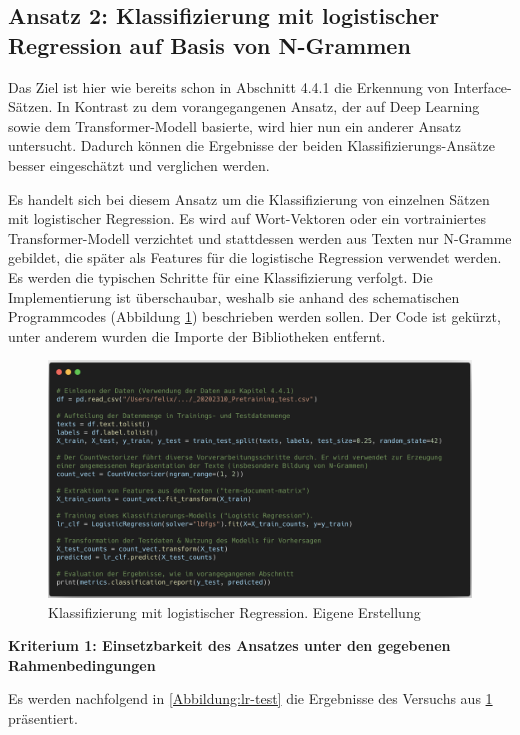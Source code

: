 \subsection{Ansatz 2: Klassifizierung mit logistischer Regression auf Basis von N-Grammen}

Das Ziel ist hier wie bereits schon in Abschnitt 4.4.1 die Erkennung von Interface-Sätzen. In Kontrast zu dem vorangegangenen Ansatz, der auf Deep Learning sowie dem Transformer-Modell basierte, wird hier nun ein anderer Ansatz untersucht. Dadurch können die Ergebnisse der beiden Klassifizierungs-Ansätze besser eingeschätzt und verglichen werden. 

Es handelt sich bei diesem Ansatz um die Klassifizierung von einzelnen Sätzen mit logistischer Regression. Es wird auf Wort-Vektoren oder ein vortrainiertes Transformer-Modell verzichtet und stattdessen werden aus Texten nur N-Gramme gebildet, die später als Features für die logistische Regression verwendet werden. Es werden die typischen Schritte \cite[S. 124]{Gupta} für eine Klassifizierung verfolgt. Die Implementierung ist überschaubar, weshalb sie anhand des schematischen Programmcodes (Abbildung \ref{Abbildung:lr-code}) beschrieben werden sollen. Der Code ist gekürzt, unter anderem wurden die Importe der Bibliotheken entfernt.

\begin{figure}[h]
\centering
\includegraphics[scale=0.4]{content/pics/Listing_2_.png}
\caption{Klassifizierung mit logistischer Regression. Eigene Erstellung}
\label{Abbildung:lr-code}
\end{figure}

{\bf Kriterium 1: Einsetzbarkeit des Ansatzes unter den gegebenen Rahmenbedingungen}

Es werden nachfolgend in \ref{Abbildung:lr-test} die Ergebnisse des Versuchs aus \ref{Abbildung:lr-code} präsentiert.

